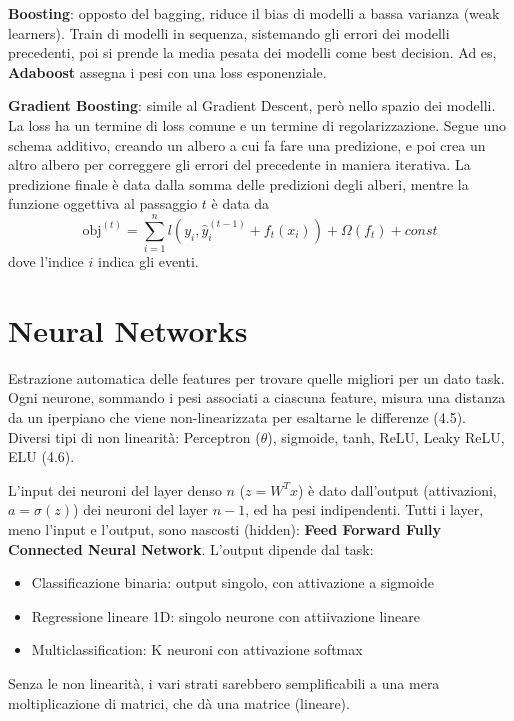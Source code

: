 \documentclass{article}
\begin{document}
\textbf{Boosting}: opposto del bagging, riduce il bias di modelli a bassa varianza (weak learners).\newline
Train di modelli in sequenza, sistemando gli errori dei modelli precedenti, poi si prende la media pesata dei 
modelli come best decision.\newline
Ad es, \textbf{Adaboost} assegna i pesi con una loss esponenziale.

\textbf{Gradient Boosting}: simile al Gradient Descent, però nello spazio dei modelli. La loss ha un termine di loss comune e un termine di regolarizzazione.\newline
Segue uno schema additivo, creando un albero a cui fa fare una predizione, e poi crea un altro albero per correggere gli errori del precedente in maniera iterativa.
La predizione finale è data dalla somma delle predizioni degli alberi, mentre la funzione oggettiva al passaggio $t$ è data da 
\[
\text{obj}^{(t)} = \sum_{i=1}^n l(y_i, \hat{y}_i^{(t-1)} + f_t(x_i)) + \Omega(f_t) + const
\]
dove l'indice $i$ indica gli eventi.



\section{Neural Networks}
Estrazione automatica delle features per trovare quelle migliori per un dato task.\newline
Ogni neurone, sommando i pesi associati a ciascuna feature, misura una distanza da un iperpiano che viene non-linearizzata
per esaltarne le differenze (4.5).\newline
Diversi tipi di non linearità: Perceptron ($\theta$), sigmoide, tanh, ReLU, Leaky ReLU, ELU (4.6).\newline

L'input dei neuroni del layer denso $n$ ($z=W^Tx$) è dato dall'output (attivazioni, $a=\sigma(z)$) dei neuroni del layer $n-1$, ed ha pesi indipendenti.
Tutti i layer, meno l'input e l'output, sono nascosti (hidden): \textbf{Feed Forward Fully Connected Neural Network}.
L'output dipende dal task:
\begin{itemize}
    \item[-] Classificazione binaria: output singolo, con attivazione a sigmoide
    \item[-] Regressione lineare 1D: singolo neurone con attiivazione lineare
    \item[-] Multiclassification: K neuroni con attivazione softmax 
\end{itemize}
Senza le non linearità, i vari strati sarebbero semplificabili a una mera moltiplicazione di matrici, che dà una matrice (lineare).\newline
\end{document}
